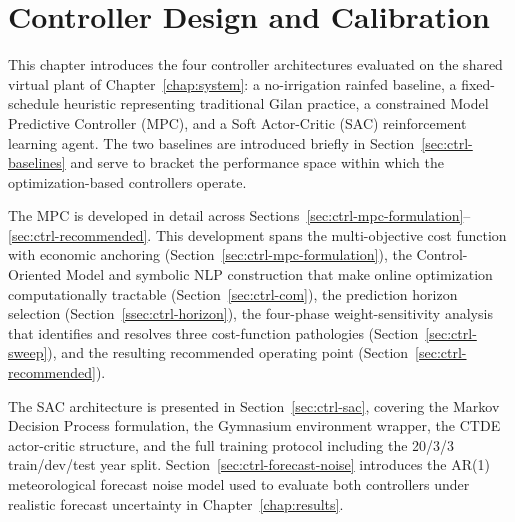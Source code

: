 %

\chapter{Controller Design and Calibration}
\label{chap:controllers}

This chapter introduces the four controller architectures evaluated on the
shared virtual plant of Chapter~\ref{chap:system}: a no-irrigation rainfed
baseline, a fixed-schedule heuristic representing traditional Gilan practice,
a constrained Model Predictive Controller (MPC), and a Soft Actor-Critic
(SAC) reinforcement learning agent. The two baselines are introduced briefly
in Section~\ref{sec:ctrl-baselines} and serve to bracket the performance
space within which the optimization-based controllers operate.

The MPC is developed in detail across
Sections~\ref{sec:ctrl-mpc-formulation}--\ref{sec:ctrl-recommended}. This
development spans the multi-objective cost function with economic anchoring
(Section~\ref{sec:ctrl-mpc-formulation}), the Control-Oriented Model and
symbolic NLP construction that make online optimization computationally
tractable (Section~\ref{sec:ctrl-com}), the prediction horizon selection
(Section~\ref{ssec:ctrl-horizon}), the four-phase weight-sensitivity analysis
that identifies and resolves three cost-function pathologies
(Section~\ref{sec:ctrl-sweep}), and the resulting recommended operating
point (Section~\ref{sec:ctrl-recommended}).

The SAC architecture is presented in Section~\ref{sec:ctrl-sac}, covering
the Markov Decision Process formulation, the Gymnasium environment wrapper,
the CTDE actor-critic structure, and the full training protocol including
the 20/3/3 train/dev/test year split. Section~\ref{sec:ctrl-forecast-noise}
introduces the AR(1) meteorological forecast noise model used to evaluate
both controllers under realistic forecast uncertainty in Chapter~\ref{chap:results}.

